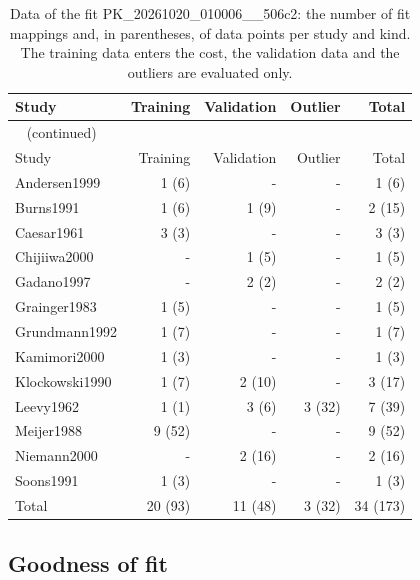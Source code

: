 \begin{longtable}{lrrrr}
\caption{Data of the fit PK\_20261020\_010006\_\_506c2: the number of fit mappings and, in parentheses, of data points per study and kind. The training data enters the cost, the validation data and the outliers are evaluated only.}\label{tab:data:PK_20261020_010006__506c2} \\
\toprule
Study & Training & Validation & Outlier & Total \\
\midrule
\endfirsthead
\multicolumn{5}{l}{\small\tablename~\thetable{} (continued)} \\
\toprule
Study & Training & Validation & Outlier & Total \\
\midrule
\endhead
\bottomrule
\endlastfoot
Andersen1999 & 1 (6) & - & - & 1 (6) \\
Burns1991 & 1 (6) & 1 (9) & - & 2 (15) \\
Caesar1961 & 3 (3) & - & - & 3 (3) \\
Chijiiwa2000 & - & 1 (5) & - & 1 (5) \\
Gadano1997 & - & 2 (2) & - & 2 (2) \\
Grainger1983 & 1 (5) & - & - & 1 (5) \\
Grundmann1992 & 1 (7) & - & - & 1 (7) \\
Kamimori2000 & 1 (3) & - & - & 1 (3) \\
Klockowski1990 & 1 (7) & 2 (10) & - & 3 (17) \\
Leevy1962 & 1 (1) & 3 (6) & 3 (32) & 7 (39) \\
Meijer1988 & 9 (52) & - & - & 9 (52) \\
Niemann2000 & - & 2 (16) & - & 2 (16) \\
Soons1991 & 1 (3) & - & - & 1 (3) \\
Total & 20 (93) & 11 (48) & 3 (32) & 34 (173) \\
\end{longtable}

\subsection{Goodness of fit}

